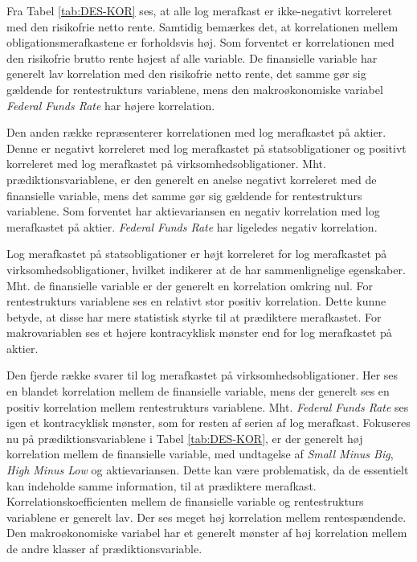 \documentclass[
  a4paper,
  oneside]{memoir}
\begin{document}
Fra Tabel \ref{tab:DES-KOR} ses, at alle log merafkast er ikke-negativt korreleret med den risikofrie netto rente. Samtidig bemærkes det, at korrelationen mellem obligationsmerafkastene er forholdsvis høj. Som forventet er korrelationen med den risikofrie brutto rente højest af alle variable. De finansielle variable har generelt lav korrelation med den risikofrie netto rente, det samme gør sig gældende for rentestrukturs variablene, mens den makroøkonomiske variabel \emph{Federal Funds Rate} har højere korrelation.

Den anden række repræsenterer korrelationen med log merafkastet på aktier. Denne er negativt korreleret med log merafkastet på statsobligationer og positivt korreleret med log merafkastet på virksomhedsobligationer. Mht. prædiktionsvariablene, er den generelt en anelse negativt korreleret med de finansielle variable, mens det samme gør sig gældende for rentestrukturs variablene. Som forventet har aktievariansen en negativ korrelation med log merafkastet på aktier. \emph{Federal Funds Rate} har ligeledes negativ korrelation.

Log merafkastet på statsobligationer er højt korreleret for log merafkastet på virksomhedsobligationer, hvilket indikerer at de har sammenlignelige egenskaber. Mht. de finansielle variable er der generelt en korrelation omkring nul. For rentestrukturs variablene ses en relativt stor positiv korrelation. Dette kunne betyde, at disse har mere statistisk styrke til at prædiktere merafkastet. For makrovariablen ses et højere kontracyklisk mønster end for log merafkastet på aktier.

Den fjerde række svarer til log merafkastet på virksomhedsobligationer. Her ses en blandet korrelation mellem de finansielle variable, mens der generelt ses en positiv korrelation mellem rentestrukturs variablene. Mht. \emph{Federal Funds Rate} ses igen et kontracyklisk mønster, som for resten af serien af log merafkast. Fokuseres nu på prædiktionsvariablene i Tabel \ref{tab:DES-KOR}, er der generelt høj korrelation mellem de finansielle variable, med undtagelse af \emph{Small Minus Big}, \emph{High Minus Low} og aktievariansen. Dette kan være problematisk, da de essentielt kan indeholde samme information, til at prædiktere merafkast. Korrelationskoefficienten mellem de finansielle variable og rentestrukturs variablene er generelt lav. Der ses meget høj korrelation mellem rentespændende. Den makroøkonomiske variabel har et generelt mønster af høj korrelation mellem de andre klasser af prædiktionsvariable.
\end{document}

